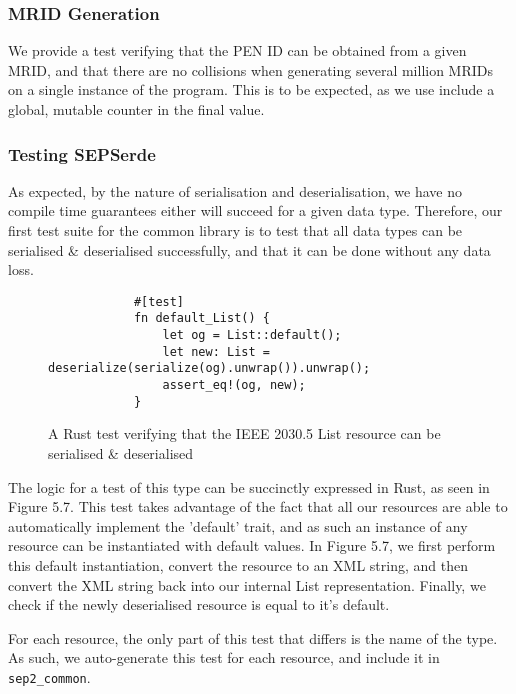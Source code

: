 \subsubsection{MRID Generation}
We provide a test verifying that the PEN ID can be obtained from a given MRID, and that there are no collisions when generating several million MRIDs on a single instance of the program. This is to be expected, as we use include a global, mutable counter in the final value.

\subsubsection{Testing SEPSerde}
As expected, by the nature of serialisation and deserialisation, we have no compile time guarantees either will succeed for a given data type.
Therefore, our first test suite for the common library is to test that all data types can be serialised \& deserialised successfully, and that it can be done without any data loss.

\begin{figure}[h]
    \begin{center}
        \begin{lstlisting}
            #[test]
            fn default_List() {
                let og = List::default();
                let new: List = deserialize(serialize(og).unwrap()).unwrap();
                assert_eq!(og, new);
            }
        \end{lstlisting}
        \label{fig:yaserdetest}
        \vspace{-10pt}
        \caption{A Rust test verifying that the IEEE 2030.5 List resource can be serialised \& deserialised}
    \end{center}
\end{figure}

The logic for a test of this type can be succinctly expressed in Rust, as seen in Figure 5.7. 
This test takes advantage of the fact that all our resources are able to automatically implement the 'default' trait, and as such an instance of any resource can be instantiated with default values.
In Figure 5.7, we first perform this default instantiation, convert the resource to an XML string, and then convert the XML string back into our internal List representation. 
Finally, we check if the newly deserialised resource is equal to it's default.

For each resource, the only part of this test that differs is the name of the type. As such, we auto-generate this test for each resource, and include it in \texttt{sep2\_common}.

